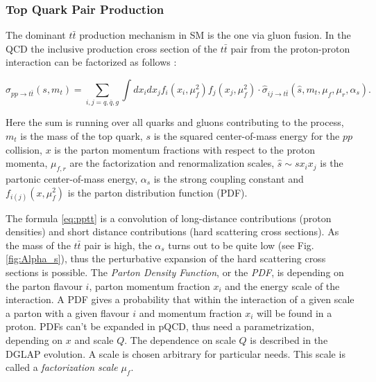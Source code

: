 \subsubsection{Top Quark Pair Production}

The dominant $t\bar{t}$ production mechanism in SM is the one via gluon fusion. In the QCD the inclusive production cross section of the $t\bar{t}$ pair
from the proton-proton interaction can be factorized as follows \cite{Schilling:2012dx}:

\begin{equation} \label{eq:pptt}
 \sigma_{pp \rightarrow t\bar{t}} (s, m_{t}) = \sum_{i,j = q, \bar{q}, g} \int dx_{i} dx_{j} f_{i}(x_{i}, \mu_{f}^{2}) f_{j}(x_{j}, \mu_{f}^{2}) \cdot \hat{\sigma}_{ij \rightarrow t\bar{t}}(\hat{s}, m_{t}, \mu_{f}, \mu_{r}, \alpha_{s}).
\end{equation}

Here the sum is running over all quarks and gluons contributing to the process, $m_{t}$ is the mass of the top quark, $s$ is the squared center-of-mass 
energy for the $pp$ collision, $x$ is the parton momentum fractions with respect to the proton momenta, $\mu_{f,r}$ are the factorization and renormalization 
scales, $\hat{s} \sim sx_{i}x_{j}$ is the partonic center-of-mass energy, $\alpha_{s}$ is the strong coupling constant and  $f_{i(j)}(x, \mu_{f}^{2})$ is the parton distribution
function (PDF). 

The formula \ref{eq:pptt} is a convolution of long-distance contributions (proton densities) and short distance contributions (hard scattering cross sections). 
As the mass of the $t\bar{t}$ pair is high, the $\alpha_{s}$ turns out
to be quite low (see Fig. \ref{fig:Alpha_s}), thus the perturbative expansion of the hard scattering cross sections is possible.
The \textit{Parton Density Function}, or the \textit{PDF}, is depending on the parton flavour $i$, parton momentum
fraction $x_{i}$ and the energy scale of the interaction. A PDF gives a probability that within the interaction of a given scale a parton with a given flavour $i$
and momentum fraction $x_{i}$ will be found in a proton. PDFs can't be expanded in pQCD, thus need a parametrization, depending on $x$ and scale $Q$. The dependence
on scale $Q$ is described in the DGLAP evolution\cite{Altarelli:1977zs, Dokshitzer:1977sg, Gribov:1972ri}. A scale is chosen arbitrary for particular needs.
This scale is called a \textit{factorization scale} $\mu_{f}$.

